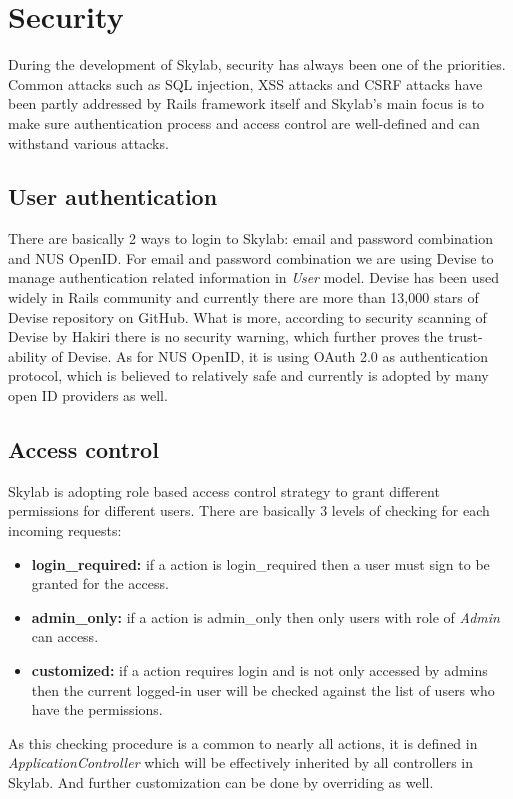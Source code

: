 \chapter{Security} \label{security}

During the development of Skylab, security has always been one of the priorities. Common attacks such as SQL injection, XSS attacks and CSRF attacks have been partly addressed by Rails framework itself and Skylab's main focus is to make sure authentication process and access control are well-defined and can withstand various attacks.

\section{User authentication}

There are basically 2 ways to login to Skylab: email and password combination and NUS OpenID. For email and password combination we are using Devise to manage authentication related information in \textit{User} model. Devise has been used widely in Rails community and currently there are more than 13,000 stars of Devise repository on GitHub\cite{citation13}. What is more, according to security scanning of Devise by Hakiri there is no security warning, which further proves the trust-ability of Devise\cite{citation13}. As for NUS OpenID, it is using OAuth 2.0 as authentication protocol, which is believed to relatively safe and currently is adopted by many open ID providers as well\cite{citation14}.

\section{Access control}

Skylab is adopting role based access control strategy to grant different permissions for different users. There are basically 3 levels of checking for each incoming requests:

\begin{itemize}
  \item \textbf{login\_required:} if a action is login\_required then a user must sign to be granted for the access.
  \item \textbf{admin\_only:} if a action is admin\_only then only users with role of \textit{Admin} can access.
  \item \textbf{customized:} if a action requires login and is not only accessed by admins then the current logged-in user will be checked against the list of users who have the permissions.
\end{itemize}

As this checking procedure is a common to nearly all actions, it is defined in \textit{ApplicationController} which will be effectively inherited by all controllers in Skylab. And further customization can be done by overriding as well.
